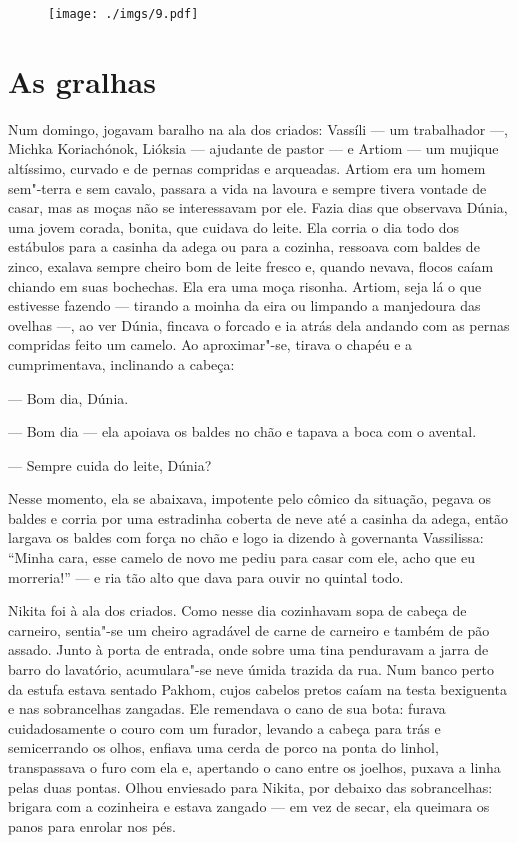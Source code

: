 \begin{figure}
\vspace*{-2.1cm}
\hspace*{-2.5cm}\texttt{[image: ./imgs/9.pdf]}
\end{figure}

\chapter{As gralhas}

Num domingo, jogavam baralho na ala dos criados: Vassíli --- um
trabalhador ---, Michka Koriachónok, Lióksia --- ajudante de pastor ---
e Artiom --- um mujique altíssimo, curvado e de pernas compridas e
arqueadas. Artiom era um homem sem"-terra e sem cavalo, passara a vida na
lavoura e sempre tivera vontade de casar, mas as moças não se
interessavam por ele. Fazia dias que observava Dúnia, uma jovem corada,
bonita, que cuidava do leite. Ela corria o dia todo dos estábulos para a
casinha da adega ou para a cozinha, ressoava com baldes de zinco,
exalava sempre cheiro bom de leite fresco e, quando nevava, flocos caíam
chiando em suas bochechas. Ela era uma moça risonha. Artiom, seja lá o
que estivesse fazendo --- tirando a moinha da eira ou limpando a
manjedoura das ovelhas ---, ao ver Dúnia, fincava o forcado e ia atrás
dela andando com as pernas compridas feito um camelo. Ao aproximar"-se,
tirava o chapéu e a cumprimentava, inclinando a cabeça:

--- Bom dia, Dúnia.

--- Bom dia --- ela apoiava os baldes no chão e tapava a boca com o
avental.

--- Sempre cuida do leite, Dúnia?

Nesse momento, ela se abaixava, impotente pelo cômico da situação,
pegava os baldes e corria por uma estradinha coberta de neve até a
casinha da adega, então largava os baldes com força no chão e logo ia
dizendo à governanta Vassilissa: ``Minha cara, esse camelo de novo me
pediu para casar com ele, acho que eu morreria!'' --- e ria tão alto que
dava para ouvir no quintal todo.

Nikita foi à ala dos criados. Como nesse dia cozinhavam sopa de cabeça
de carneiro, sentia"-se um cheiro agradável de carne de carneiro e também
de pão assado. Junto à porta de entrada, onde sobre uma tina penduravam
a jarra de barro do lavatório, acumulara"-se neve úmida trazida
da rua. Num banco perto da estufa estava sentado Pakhom, cujos cabelos
pretos caíam na testa bexiguenta e nas sobrancelhas zangadas. Ele
remendava o cano de sua bota: furava cuidadosamente o couro com um
furador, levando a cabeça para trás e semicerrando os olhos, enfiava uma
cerda de porco na ponta do linhol, transpassava o furo com ela e,
apertando o cano entre os joelhos, puxava a linha pelas duas pontas.
Olhou enviesado para Nikita, por debaixo das sobrancelhas: brigara com a
cozinheira e estava zangado --- em vez de secar, ela queimara os panos
para enrolar nos pés.

